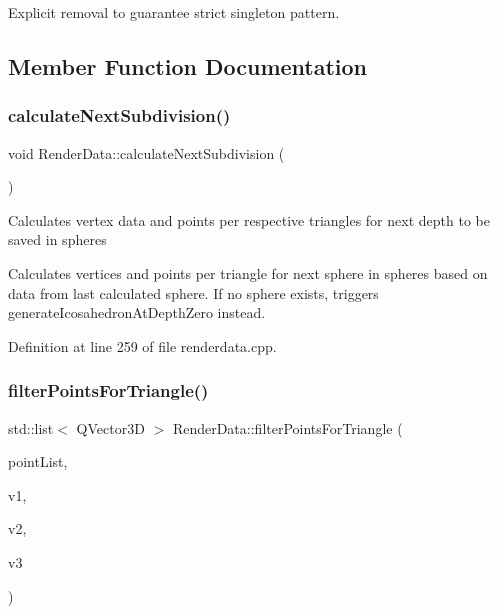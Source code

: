 Explicit removal to guarantee strict singleton pattern. 



\subsection{Member Function Documentation}
\mbox{\label{class_render_data_ac1bbf9770f040e452f676358ee699767}} 
\subsubsection{\texorpdfstring{calculate\+Next\+Subdivision()}{calculateNextSubdivision()}}
{\footnotesize\ttfamily void Render\+Data\+::calculate\+Next\+Subdivision (\begin{DoxyParamCaption}{ }\end{DoxyParamCaption})\hspace{0.3cm}{\ttfamily [private]}}

Calculates vertex data and points per respective triangles for next depth to be saved in spheres

Calculates vertices and points per triangle for next sphere in spheres based on data from last calculated sphere. If no sphere exists, triggers \textquotesingle{}generate\+Icosahedron\+At\+Depth\+Zero\textquotesingle{} instead. 

Definition at line 259 of file renderdata.\+cpp.

\mbox{\label{class_render_data_af74f8858b9e0dedb914f24390e140a04}} 
\subsubsection{\texorpdfstring{filter\+Points\+For\+Triangle()}{filterPointsForTriangle()}}
{\footnotesize\ttfamily std\+::list$<$ Q\+Vector3D $>$ Render\+Data\+::filter\+Points\+For\+Triangle (\begin{DoxyParamCaption}\item[{std\+::list$<$ Q\+Vector3D $>$ \&}]{point\+List,  }\item[{float $\ast$}]{v1,  }\item[{float $\ast$}]{v2,  }\item[{float $\ast$}]{v3 }\end{DoxyParamCaption})\hspace{0.3cm}{\ttfamily [private]}}


